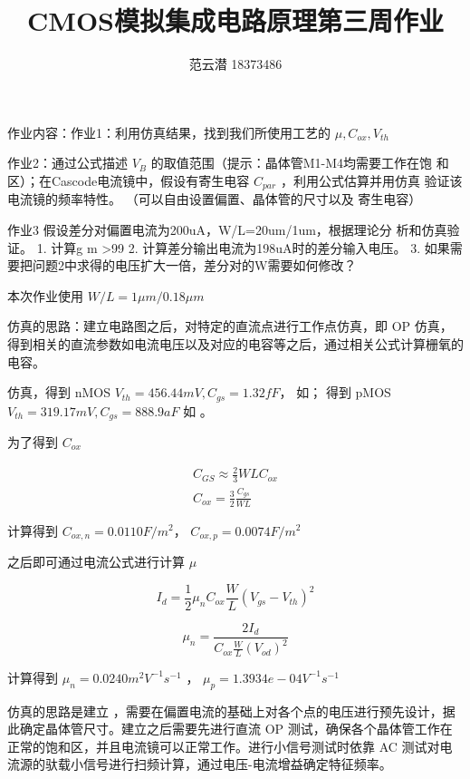 \documentclass[lang=cn,11pt,a4paper,cite=authoryear]{elegantpaper}
\title{CMOS模拟集成电路原理\quad 第三周作业}
\author{范云潜 18373486}
\institute{微电子学院 184111 班}
\date{\zhtoday}
\begin{document}
\maketitle

作业内容：作业1：利用仿真结果，找到我们所使用工艺的 \(\mu, C_{ox}, V_{th}\)

作业2：通过公式描述 \(V_B\) 的取值范围（提示：晶体管M1-M4均需要工作在饱
和区）；在Cascode电流镜中，假设有寄生电容 \(C_{par}\) ，利用公式估算并用仿真
验证该电流镜的频率特性。 （可以自由设置偏置、晶体管的尺寸以及
寄生电容）


作业3
假设差分对偏置电流为200uA，W/L=20um/1um，根据理论分
析和仿真验证。
1. 计算g m >99%
2. 计算差分输出电流为198uA时的差分输入电压。
3. 如果需要把问题2中求得的电压扩大一倍，差分对的W需要如何修改？


本次作业使用 \(W/L = 1\mu m / 0.18 \mu m\)


仿真的思路：建立电路图之后，对特定的直流点进行工作点仿真，即 OP 仿真，得到相关的直流参数如电流电压以及对应的电容等之后，通过相关公式计算栅氧的电容。

仿真，得到 nMOS \(V_{th} = 456.44 mV, C_{gs} = 1.32 fF \)， 如； 得到 pMOS \(V_{th} = 319.17 mV, C_{gs} = 888.9 aF\) 如 。




为了得到 \(C_{ox}\) 

\[\begin{aligned}
    C_{GS} \approx \frac{2}{3} WL C_{ox} \\ 
    C_{ox} = \frac{3}{2} \frac{C_{gs}}{WL} 
\end{aligned}\]

计算得到 \(C_{ox,n} = 0.0110 F/m^2\)， \(C_{ox,p} = 0.0074 F/m^2\)

之后即可通过电流公式进行计算 \(\mu\)

\[I_d = \frac{1}{2} \mu_n C_{ox} \frac{W}{L} (V_{gs} - V_{th})^2\]

\[\mu_n = \frac{2 I_d}{C_{ox} \frac{W}{L}(V_{od})^2}\]

计算得到 \(\mu_n = 0.0240 m^2 V^{-1}s^{-1}\) ， \(\mu_p = 1.3934e-04V^{-1}s^{-1} \)



仿真的思路是建立 ，需要在偏置电流的基础上对各个点的电压进行预先设计，据此确定晶体管尺寸。建立之后需要先进行直流 OP 测试，确保各个晶体管工作在正常的饱和区，并且电流镜可以正常工作。进行小信号测试时依靠 AC 测试对电流源的驮载小信号进行扫频计算，通过电压-电流增益确定特征频率。
\end{document}

